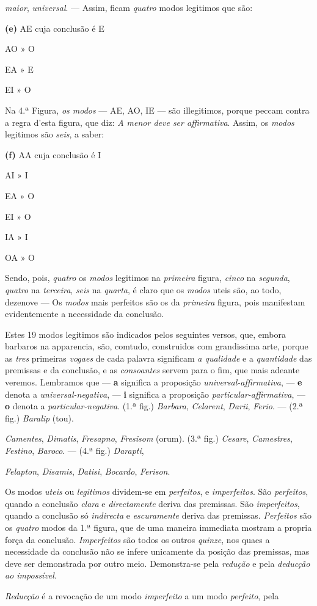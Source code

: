 \emph{maior}, \emph{universal}. --- Assim, ficam \emph{quatro} modos legitimos que são:\par \textbf{(e)} AE cuja conclusão é E\par AO » O\par EA » E\par EI » O\par Na 4.ª Figura, \emph{os modos} --- AE, AO, IE --- são illegitimos, porque peccam contra a regra d'esta figura, que diz: \emph{A menor deve ser affirmativa}. Assim, os \emph{modos} legitimos são \emph{seis}, a saber:\par \textbf{(f)} AA cuja conclusão é I\par AI » I\par EA » O\par EI » O\par IA » I\par OA » O\par Sendo, pois, \emph{quatro} os \emph{modos} legitimos na \emph{primeira} figura, \emph{cinco} na \emph{segunda}, \emph{quatro} na \emph{terceira}, \emph{seis} na \emph{quarta}, é claro que os \emph{modos} uteis são, ao todo, dezenove --- Os \emph{modos} mais perfeitos são os da \emph{primeira} figura, pois manifestam evidentemente a necessidade da conclusão.\par Estes 19 modos legitimos são indicados pelos seguintes versos, que, embora barbaros na apparencia, são, comtudo, construidos com grandissima arte, porque as \emph{tres} primeiras \emph{vogaes} de cada palavra significam \emph{a qualidade} e a \emph{quantidade} das premissas e da conclusão, e as \emph{consoantes} servem para o fim, que mais adeante veremos. Lembramos que --- \textbf{a} significa a proposição \emph{universal-affirmativa}, --- \textbf{e} denota a \emph{universal-negativa}, --- \textbf{i} significa a proposição \emph{particular-affirmativa}, --- \textbf{o} denota a \emph{particular-negativa}. (1.ª fig.) \emph{Barbara}, \emph{Celarent}, \emph{Darii}, \emph{Ferio}. --- (2.ª fig.) \emph{Baralip} (tou).\par \emph{Camentes}, \emph{Dimatis}, \emph{Fresapno}, \emph{Fresisom} (orum). (3.ª fig.) \emph{Cesare}, \emph{Camestres}, \emph{Festino}, \emph{Baroco}. --- (4.ª fig.) \emph{Darapti},\par \emph{Felapton}, \emph{Disamis}, \emph{Datisi}, \emph{Bocardo}, \emph{Ferison}.\par Os modos \emph{uteis} ou \emph{legitimos} dividem-se em \emph{perfeitos}, e \emph{imperfeitos}. São \emph{perfeitos}, quando a conclusão \emph{clara} e \emph{directamente} deriva das premissas. São \emph{imperfeitos}, quando a conclusão só \emph{indirecta} e \emph{escuramente} deriva das premissas. \emph{Perfeitos} são os \emph{quatro} modos da 1.ª figura, que de uma maneira immediata mostram a propria força da conclusão. \emph{Imperfeitos} são todos os outros \emph{quinze}, nos quaes a necessidade da conclusão não se infere unicamente da posição das premissas, mas deve ser demonstrada por outro meio. Demonstra-se pela \emph{redução} e pela \emph{deducção ao impossível}.\par \emph{Reducção} é a revocação de um modo \emph{imperfeito} a um modo \emph{perfeito}, pela 